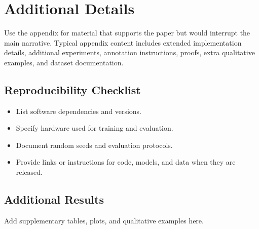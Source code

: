 \section{Additional Details}
\label{sec:appendix_details}

Use the appendix for material that supports the paper but would interrupt the main narrative.
Typical appendix content includes extended implementation details, additional experiments, annotation instructions, proofs, extra qualitative examples, and dataset documentation.

\subsection{Reproducibility Checklist}

\begin{itemize}
    \item List software dependencies and versions.
    \item Specify hardware used for training and evaluation.
    \item Document random seeds and evaluation protocols.
    \item Provide links or instructions for code, models, and data when they are released.
\end{itemize}

\subsection{Additional Results}

Add supplementary tables, plots, and qualitative examples here.
